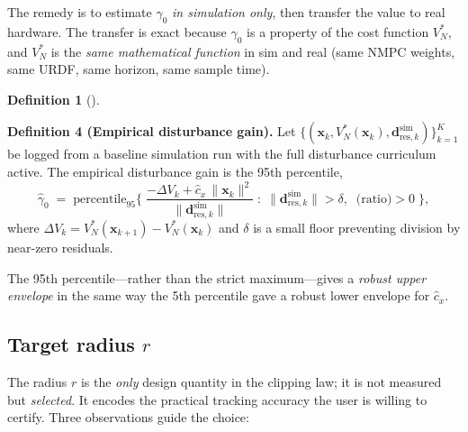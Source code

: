 \documentclass[
  11pt,
]{article}
\theoremstyle{plain}
\theoremstyle{plain}
\theoremstyle{definition}
\newtheorem{definition}{Definition}[section]
\theoremstyle{remark}
\begin{document}
The remedy is to estimate \(\gamma_0\) \emph{in simulation only}, then
transfer the value to real hardware. The transfer is exact because
\(\gamma_0\) is a property of the cost function \(V_N^*\), and \(V_N^*\)
is the \emph{same mathematical function} in sim and real (same NMPC
weights, same URDF, same horizon, same sample time).

\begin{definition}[]\protect\hypertarget{def-gamma-emp}{}\label{def-gamma-emp}

\textbf{Definition 4 (Empirical disturbance gain).} Let
\(\{(\bm{x}_k, V_N^*(\bm{x}_k), \bm{d}_{\mathrm{res},k}^{\mathrm{sim}})\}_{k=1}^{K}\)
be logged from a baseline simulation run with the full disturbance
curriculum active. The empirical disturbance gain is the 95th
percentile, \[
\hat{\gamma}_0 \;=\;
\mathrm{percentile}_{95}\!\Biggl\{\;
\frac{-\Delta V_k + \hat{c}_x\,\|\bm{x}_k\|^2}
     {\|\bm{d}_{\mathrm{res},k}^{\mathrm{sim}}\|}
\;:\;
\|\bm{d}_{\mathrm{res},k}^{\mathrm{sim}}\| > \delta,
\;\;\text{(ratio)} > 0
\;\Biggr\},
\] where \(\Delta V_k = V_N^*(\bm{x}_{k+1}) - V_N^*(\bm{x}_k)\) and
\(\delta\) is a small floor preventing division by near-zero residuals.

\end{definition}

The 95th percentile---rather than the strict maximum---gives a
\emph{robust upper envelope} in the same way the 5th percentile gave a
robust lower envelope for \(\hat{c}_x\).

\subsection{\texorpdfstring{Target radius
\(r\)}{Target radius r}}\label{sec-estim-r}

The radius \(r\) is the \emph{only} design quantity in the clipping law;
it is not measured but \emph{selected}. It encodes the practical
tracking accuracy the user is willing to certify. Three observations
guide the choice:
\end{document}
